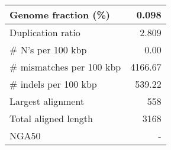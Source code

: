 \documentclass[12pt,a4paper]{article}
\begin{document}
\begin{table}[ht]
\begin{center}
\begin{tabular}{|l*{1}{|r}|}
Genome fraction (\%) & 0.098 \\ \hline
Duplication ratio & 2.809 \\ \hline
\# N's per 100 kbp & 0.00 \\ \hline
\# mismatches per 100 kbp & 4166.67 \\ \hline
\# indels per 100 kbp & 539.22 \\ \hline
Largest alignment & 558 \\ \hline
Total aligned length & 3168 \\ \hline
NGA50 & - \\ \hline
\end{tabular}
\end{center}
\end{table}
\end{document}
